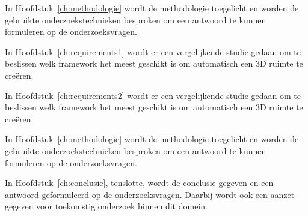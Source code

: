 In Hoofdstuk~\ref{ch:methodologie} wordt de methodologie toegelicht en worden de gebruikte onderzoekstechnieken besproken om een antwoord te kunnen formuleren op de onderzoeksvragen.


In Hoofdstuk~\ref{ch:requirements1} wordt er een vergelijkende studie gedaan om te beslissen welk framework het meest geschikt is om automatisch een 3D ruimte te creëren. 

In Hoofdstuk~\ref{ch:requirements2} wordt er een vergelijkende studie gedaan om te beslissen welk framework het meest geschikt is om automatisch een 3D ruimte te creëren. 


In Hoofdstuk~\ref{ch:methodologie} wordt de methodologie toegelicht en worden de gebruikte onderzoekstechnieken besproken om een antwoord te kunnen formuleren op de onderzoeksvragen.


In Hoofdstuk~\ref{ch:conclusie}, tenslotte, wordt de conclusie gegeven en een antwoord geformuleerd op de onderzoeksvragen. Daarbij wordt ook een aanzet gegeven voor toekomstig onderzoek binnen dit domein.